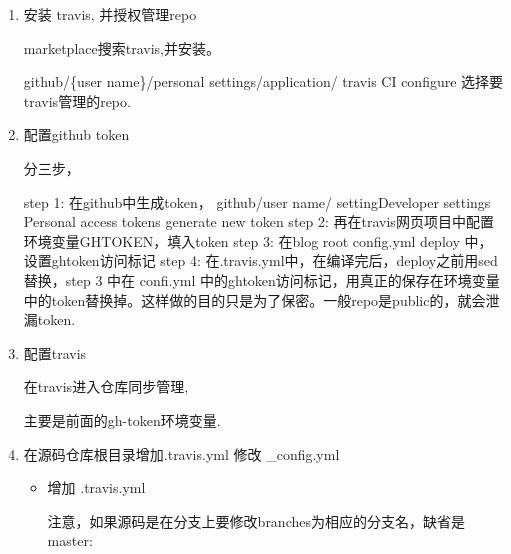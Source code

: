 \documentclass[letterpaper,12pt,english]{sphinxmanual}
\begin{document}
\begin{enumerate}
%
\item {} 
安装 travis, 并授权管理repo

marketplace搜索travis,并安装。

github/\{user name\}/personal settings/application/ travis CI configure
选择要travis管理的repo.

\item {} 
配置github token

分三步，

\begin{sphinxVerbatim}[commandchars=\\\{\}]
step 1: 在github中生成token，
        github/\PYGZob{}user name\PYGZcb{}/\PYGZhy{}\PYGZgt{} setting\PYGZhy{}\PYGZgt{}Developer settings\PYGZhy{}\PYGZgt{} Personal access tokens \PYGZhy{}\PYGZgt{} generate new token
step 2: 再在travis网页项目中配置环境变量\PYGZdl{}GH\PYGZus{}TOKEN，填入token
step 3: 在blog root \PYGZus{}config.yml deploy 中，设置gh\PYGZus{}token访问标记
step 4: 在.travis.yml中，在编译完后，deploy之前用sed替换，step 3 中在 \PYGZus{}confi.yml 中的gh\PYGZus{}token访问标记，用真正的保存在环境变量中的token替换掉。这样做的目的只是为了保密。一般repo是public的，就会泄漏token.
\end{sphinxVerbatim}

\item {} 
配置travis

在travis进入仓库同步管理, 

主要是前面的gh-token环境变量.

\item {} 
在源码仓库根目录增加.travis.yml 修改 \_config.yml
\begin{itemize}
\item {} 
增加 .travis.yml

注意，如果源码是在分支上要修改branches为相应的分支名，缺省是master:

\begin{sphinxVerbatim}[commandchars=\\\{\}]

 
 
   
     


\end{sphinxVerbatim}
\end{itemize}
\end{enumerate}
\end{document}
